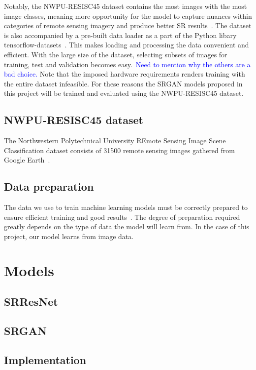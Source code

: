 Notably, the NWPU-RESISC45 dataset contains the most images with the most image classes, meaning more opportunity for the model to capture nuances within categories of remote sensing imagery and produce better SR results~\cite{ref}. The dataset is also accompanied by a pre-built data loader as a part of the Python libary tensorflow-datasets~\cite{ref}. This makes loading and processing the data convenient and efficient. With the large size of the dataset, selecting subsets of images for training, test and validation becomes easy.\ \textcolor{blue}{Need to mention why the others are a bad choice.} Note that the imposed hardware requirements renders training with the entire dataset infeasible. For these reasons the SRGAN models proposed in this project will be trained and evaluated using the NWPU-RESISC45 dataset.

\subsection{NWPU-RESISC45 dataset}
The Northwestern Polytechnical University REmote Sensing Image Scene Classification dataset consists of 31500 remote sensing images gathered from Google Earth~\cite{resisc45}. 

\subsection{Data preparation}
The data we use to train machine learning models must be correctly prepared to ensure efficient training and good results~\cite{ref}. The degree of preparation required greatly depends on the type of data the model will learn from. In the case of this project, our model learns from image data.

\section{Models}

\subsection{SRResNet}

\subsection{SRGAN}

\subsection{Implementation}

